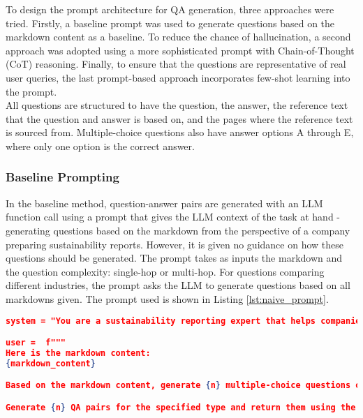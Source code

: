 To design the prompt architecture for QA generation, three approaches were tried. Firstly, a baseline prompt was used to generate questions based on the markdown content as a baseline. To reduce the chance of hallucination, a second approach was adopted using a more sophisticated prompt with Chain-of-Thought (CoT) reasoning. Finally, to ensure that the questions are representative of real user queries, the last prompt-based approach incorporates few-shot learning into the prompt. \\

All questions are structured to have the question, the answer, the reference text that the question and answer is based on, and the pages where the reference text is sourced from. Multiple-choice questions also have answer options A through E, where only one option is the correct answer. 

\subsubsection{Baseline Prompting}

In the baseline method, question-answer pairs are generated with an LLM function call using a prompt that gives the LLM context of the task at hand - generating questions based on the markdown from the perspective of a company preparing sustainability reports. However, it is given no guidance on how these questions should be generated. The prompt takes as inputs the markdown and the question complexity: single-hop or multi-hop. For questions comparing different industries, the prompt asks the LLM to generate questions based on all markdowns given. The prompt used is shown in Listing \ref{lst:naive_prompt}.\\
\begin{lstlisting}[language=JSON,firstnumber=1,label={lst:naive_prompt},caption={Baseline prompt for `local' multiple-choice question generation}]
system = "You are a sustainability reporting expert that helps companies draft their corporate sustainability reports using the IFRS reporting standards. You are preparing some questions that a company might ask while preparing its sustainability report, for which the answer can be taken from the context given in the markdown below."

user =  f"""
Here is the markdown content:
{markdown_content}

Based on the markdown content, generate {n} multiple-choice questions of type {qa_type}.

Generate {n} QA pairs for the specified type and return them using the provided schema."""
\end{lstlisting}

